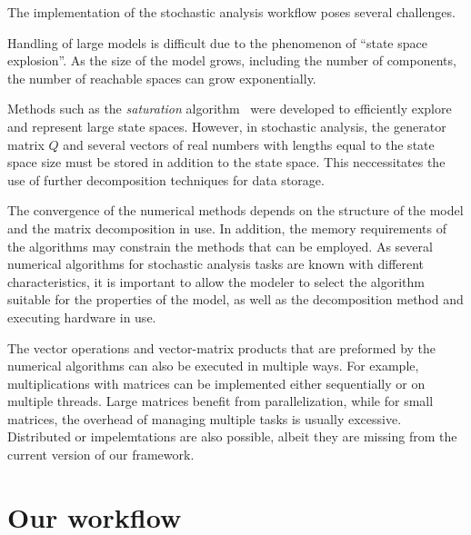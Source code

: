 The implementation of the stochastic analysis workflow poses several
challenges.

Handling of large models is difficult due to the phenomenon of
\enquote{state space explosion}. As the size of the model grows,
including the number of components, the number of reachable spaces can
grow exponentially.

Methods such as the \emph{saturation} algorithm~\citep{Ciardo:2006}
were developed to efficiently explore and represent large state
spaces. However, in stochastic analysis, the generator matrix $Q$ and
several vectors of real numbers with lengths equal to the state space
size must be stored in addition to the state space. This neccessitates
the use of further decomposition techniques for data storage.

The convergence of the numerical methods depends on the structure of
the model and the matrix decomposition in use. In addition, the memory
requirements of the algorithms may constrain the methods that can be
employed. As several numerical algorithms for stochastic analysis
tasks are known with different characteristics, it is important to
allow the modeler to select the algorithm suitable for the properties
of the model, as well as the decomposition method and executing
hardware in use.

The vector operations and vector-matrix products that are preformed by
the numerical algorithms can also be executed in multiple ways. For
example, multiplications with matrices can be implemented either
sequentially or on multiple threads. Large matrices benefit from
parallelization, while for small matrices, the overhead of managing
multiple tasks is usually excessive. Distributed or 
impelemtations are also possible, albeit they are missing from the
current version of our framework.

\section{Our workflow}

